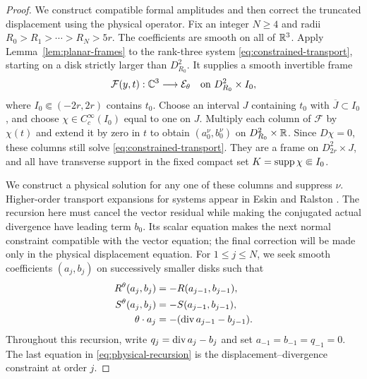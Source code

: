 \begin{proof}
We construct compatible formal amplitudes and then correct the
truncated displacement using the physical operator.
Fix an integer $N\ge4$ and radii
$R_0>R_1>\cdots>R_N>5r$. The coefficients are smooth on all of
$\mathbb R^3$. Apply Lemma~\ref{lem:planar-frames} to the rank-three
system \eqref{eq:constrained-transport}, starting on a disk
strictly larger than $D_{R_0}^2$. It supplies a smooth
invertible frame
\[
 \mathcal F(y,t):\mathbb C^3\longrightarrow\mathcal E_\theta
 \quad\text{on }D_{R_0}^2\times I_0,
\]
where $I_0\Subset(-2r,2r)$ contains $t_0$. Choose an interval
$J$ containing $t_0$ with $\overline J\subset I_0$, and choose
$\chi\in C_c^\infty(I_0)$ equal to one on $J$. Multiply each
column of $\mathcal F$ by $\chi(t)$ and extend it by zero in
$t$ to obtain $(a_0^{\nu},b_0^{\nu})$ on
$D_{R_0}^2\times\mathbb R$. Since $D\chi=0$, these columns still
solve \eqref{eq:constrained-transport}. They are a frame on
$D_{2r}^2\times J$, and all have transverse support in the
fixed compact set $K=\operatorname{supp}\chi\Subset I_0$.

We construct a physical solution for any one of these columns
and suppress $\nu$. Higher-order transport expansions for systems appear
in Eskin and Ralston
\cite[Section~2, equations~(2.2)--(2.4)]{EskinRalston2004}.
The recursion here must cancel the vector residual
while making the conjugated actual divergence have leading term $b_0$.
Its scalar equation makes the next normal constraint compatible with
the vector equation;
the final correction will be made only in the physical displacement
equation. For $1\le j\le N$, we seek smooth coefficients $(a_j,b_j)$
on successively smaller disks such that
\begin{equation}
\label{eq:physical-recursion}
\begin{aligned}
 R^\theta(a_j,b_j)&=-R(a_{j-1},b_{j-1}),\\
 S^\theta(a_j,b_j)&=-S(a_{j-1},b_{j-1}),\\
 \theta\cdot a_j&=-(\operatorname{div} a_{j-1}-b_{j-1}).
\end{aligned}
\end{equation}
Throughout this recursion, write $q_j=\operatorname{div} a_j-b_j$ and set
$a_{-1}=b_{-1}=q_{-1}=0$.
The last equation in \eqref{eq:physical-recursion} is the
displacement--divergence constraint at order $j$.


\end{proof}
